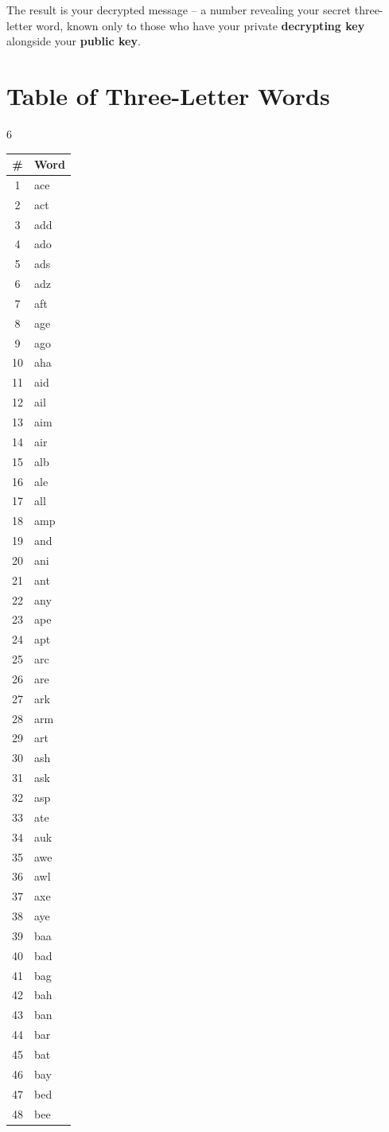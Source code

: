 \documentclass[11pt,a4paper]{article}
\begin{document}
The result is your decrypted message -- a number revealing your secret three-letter word, known only to those who have your private \textbf{decrypting key} alongside your \textbf{public key}.

\newpage

\section*{Table of Three-Letter Words}

\begin{multicols}{6}
\small
\begin{tabular}{cl}
\toprule
\# & Word \\
\midrule
1 & ace \\
2 & act \\
3 & add \\
4 & ado \\
5 & ads \\
6 & adz \\
7 & aft \\
8 & age \\
9 & ago \\
10 & aha \\
11 & aid \\
12 & ail \\
13 & aim \\
14 & air \\
15 & alb \\
16 & ale \\
17 & all \\
18 & amp \\
19 & and \\
20 & ani \\
21 & ant \\
22 & any \\
23 & ape \\
24 & apt \\
25 & arc \\
26 & are \\
27 & ark \\
28 & arm \\
29 & art \\
30 & ash \\
31 & ask \\
32 & asp \\
33 & ate \\
34 & auk \\
35 & awe \\
36 & awl \\
37 & axe \\
38 & aye \\
39 & baa \\
40 & bad \\
41 & bag \\
42 & bah \\
43 & ban \\
44 & bar \\
45 & bat \\
46 & bay \\
47 & bed \\
48 & bee \\
\bottomrule
\end{tabular}


\end{multicols}
\end{document}
